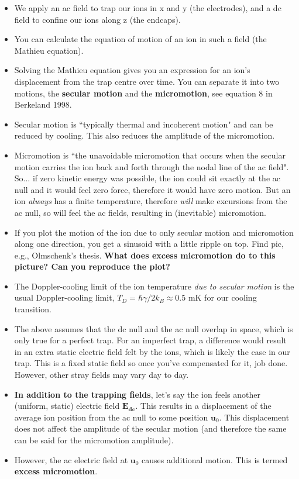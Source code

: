 \documentclass{article}
\begin{document}
\begin{itemize}
\item We apply an ac field to trap our ions in x and y (the electrodes), and a dc field to confine our ions along z (the endcaps).
\item You can calculate the equation of motion of an ion in such a field (the Mathieu equation).
\item Solving the Mathieu equation gives you an expression for an ion's displacement from the trap centre over time. You can separate it into two motions, the \textbf{secular motion} and the \textbf{micromotion}, see equation 8 in Berkeland 1998. 
\item Secular motion is ``typically thermal and incoherent motion" and can be reduced by cooling. This also reduces the amplitude of the micromotion.
\item Micromotion is ``the unavoidable micromotion that occurs when the secular motion carries the ion back and forth through the nodal line of the ac field". So... if zero kinetic energy was possible, the ion could sit exactly at the ac null and it would feel zero force, therefore it would have zero motion. But an ion \textit{always} has a finite temperature, therefore \textit{will} make excursions from the ac null, so will feel the ac fields, resulting in (inevitable) micromotion.
\item If you plot the motion of the ion due to only secular motion and micromotion along one direction, you get a sinusoid with a little ripple on top. Find pic, e.g., Olmschenk's thesis. \textbf{What does excess micromotion do to this picture? Can you reproduce the plot?}
\item The Doppler-cooling limit of the ion temperature \textit{due to secular motion} is the usual Doppler-cooling limit, $T_D = \hbar \gamma / 2 k_B \approx 0.5$ mK for our cooling transition.
\item The above assumes that the dc null and the ac null overlap in space, which is only true for a perfect trap. For an imperfect trap, a difference would result in an extra static electric field felt by the ions, which is likely the case in our trap. This is a fixed static field so once you've compensated for it, job done. However, other stray fields may vary day to day.
\item \textbf{In addition to the trapping fields}, let's say the ion feels another (uniform, static) electric field $\mathbf{E_{dc}}$. This results in a displacement of the average ion position from the ac null to some position $\mathbf{u}_0$. This displacement does not affect the amplitude of the secular motion (and therefore the same can be said for the micromotion amplitude).
\item However, the ac electric field at $\mathbf{u}_0$ causes additional motion. This is termed \textbf{excess micromotion}. 
\end{itemize}
\end{document}
